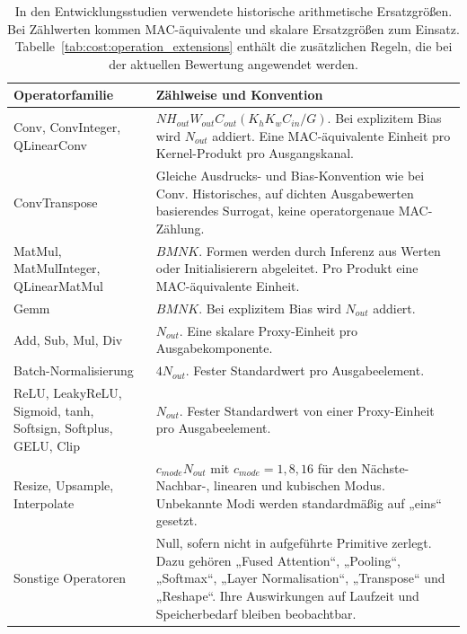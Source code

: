 \begin{table}[H]
\centering\small\TableSetup
\caption{In den Entwicklungsstudien verwendete historische arithmetische Ersatzgrößen. Bei Zählwerten kommen MAC-äquivalente und skalare Ersatzgrößen zum Einsatz. Tabelle~\ref{tab:cost:operation_extensions} enthält die zusätzlichen Regeln, die bei der aktuellen Bewertung angewendet werden.}
\label{tab:flop_formulas_landscape}
\begin{tabularx}{\linewidth}{@{}L{3.5cm}Y@{}}
\toprule
Operatorfamilie & Zählweise und Konvention \\
\midrule
Conv, ConvInteger, QLinearConv & $NH_{out}W_{out}C_{out}(K_hK_wC_{in}/G)$. Bei explizitem Bias wird $N_{out}$ addiert. Eine MAC-äquivalente Einheit pro Kernel-Produkt pro Ausgangskanal. \\
ConvTranspose & Gleiche Ausdrucks- und Bias-Konvention wie bei Conv. Historisches, auf dichten Ausgabewerten basierendes Surrogat, keine operatorgenaue MAC-Zählung. \\
MatMul, MatMulInteger, QLinearMatMul & $BMNK$. Formen werden durch Inferenz aus Werten oder Initialisierern abgeleitet. Pro Produkt eine MAC-äquivalente Einheit. \\
Gemm & $BMNK$. Bei explizitem Bias wird $N_{out}$ addiert. \\
Add, Sub, Mul, Div & $N_{out}$. Eine skalare Proxy-Einheit pro Ausgabekomponente. \\
Batch-Normalisierung & $4N_{out}$. Fester Standardwert pro Ausgabeelement. \\
ReLU, LeakyReLU, Sigmoid, tanh, Softsign, Softplus, GELU, Clip & $N_{out}$. Fester Standardwert von einer Proxy-Einheit pro Ausgabeelement. \\
Resize, Upsample, Interpolate & $c_{mode}N_{out}$ mit $c_{mode}=1,8,16$ für den Nächste-Nachbar-, linearen und kubischen Modus. Unbekannte Modi werden standardmäßig auf „eins“ gesetzt. \\
Sonstige Operatoren & Null, sofern nicht in aufgeführte Primitive zerlegt. Dazu gehören „Fused Attention“, „Pooling“, „Softmax“, „Layer Normalisation“, „Transpose“ und „Reshape“. Ihre Auswirkungen auf Laufzeit und Speicherbedarf bleiben beobachtbar. \\
\bottomrule
\end{tabularx}
\end{table}
